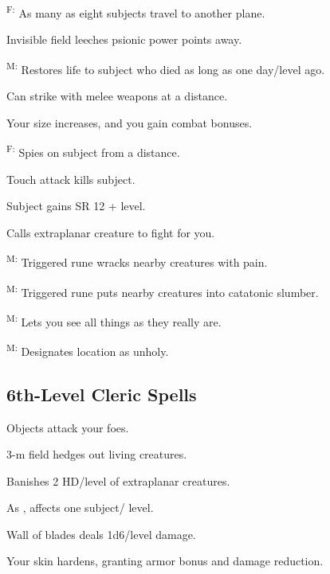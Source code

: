 \textsuperscript{F:} As many as eight subjects travel to another plane.

 Invisible field leeches psionic power points away.

\textsuperscript{M:} Restores life to subject who died as long as one day/level ago.

 Can strike with melee weapons at a distance. %

 Your size increases, and you gain combat bonuses.

\textsuperscript{F:} Spies on subject from a distance.

 Touch attack kills subject.

 Subject gains SR 12 + level.

 Calls extraplanar creature to fight for you.

\textsuperscript{M:} Triggered rune wracks nearby creatures with pain.

\textsuperscript{M:} Triggered rune puts nearby creatures into catatonic slumber.

\textsuperscript{M:} Lets you see all things as they really are.

\textsuperscript{M:} Designates location as unholy.




\subsection{6th-Level Cleric Spells}

 Objects attack your foes.

 3-m field hedges out living creatures.

 Banishes 2 HD/level of extraplanar creatures.

 As , affects one subject/ level.

 Wall of blades deals 1d6/level damage.

 Your skin hardens, granting armor bonus and damage reduction. %

